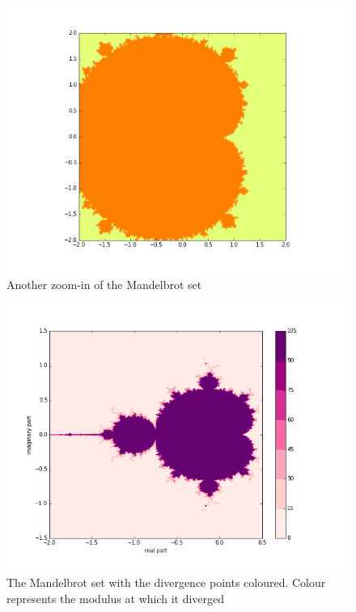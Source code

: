 \documentclass{article}
\begin{document}
\begin{figure}
  \includegraphics[width=\linewidth]{Mandel_03.png}
  \caption{Another zoom-in of the Mandelbrot set}
  \label{fig:mandelbrot3}
\end{figure}

\begin{figure}
  \includegraphics[width=\linewidth]{Mandel_div.png}
  \caption{The Mandelbrot set with the divergence points coloured. Colour represents the modulus at which it diverged}
  \label{fig:mandelbrot3}
\end{figure}
\end{document}
